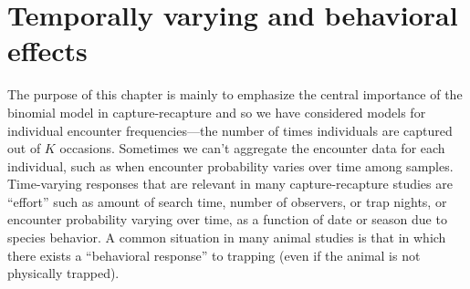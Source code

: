 \section{Temporally varying and behavioral effects}
\label{closed.sec.timebehavefx}

The purpose of this chapter is mainly to emphasize the central
importance of the binomial model in capture-recapture and so we have
considered models for individual encounter frequencies---the number of
times individuals are captured out of $K$ occasions.  Sometimes we
can't aggregate the encounter data for each individual, such as when
encounter probability varies over time among samples.  Time-varying
responses that are relevant in many capture-recapture studies are
``effort'' such as amount of search time, number of observers, or trap
nights, or encounter probability varying over time, as a function of
date or season \citep{kery_etal:2010} due to species behavior.  A
common situation in many animal studies is that in which there exists
a ``behavioral response'' to trapping (even if the animal is not
physically trapped).

